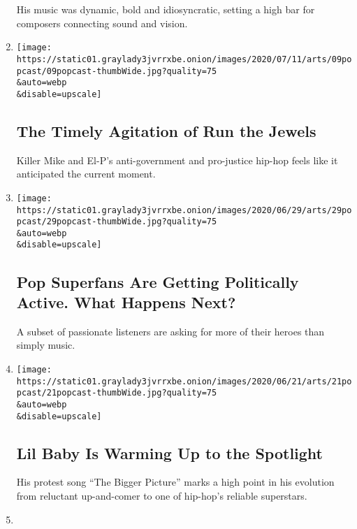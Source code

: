 \begin{enumerate}
  His music was dynamic, bold and idiosyncratic, setting a high bar for
  composers connecting sound and vision.
\item
  \href{/2020/07/09/arts/music/popcast-run-the-jewels.html}{}

  \texttt{[image: https://static01.graylady3jvrrxbe.onion/images/2020/07/11/arts/09popcast/09popcast-thumbWide.jpg?quality=75\\\&auto=webp\\\&disable=upscale]}

  \hypertarget{the-timely-agitation-of-run-the-jewels}{%
  \subsection{The Timely Agitation of Run the
  Jewels}\label{the-timely-agitation-of-run-the-jewels}}

  Killer Mike and El-P's anti-government and pro-justice hip-hop feels
  like it anticipated the current moment.
\item
  \href{/2020/06/30/arts/music/popcast-superfans-politics.html}{}

  \texttt{[image: https://static01.graylady3jvrrxbe.onion/images/2020/06/29/arts/29popcast/29popcast-thumbWide.jpg?quality=75\\\&auto=webp\\\&disable=upscale]}

  \hypertarget{pop-superfans-are-getting-politically-active-what-happens-next}{%
  \subsection{Pop Superfans Are Getting Politically Active. What Happens
  Next?}\label{pop-superfans-are-getting-politically-active-what-happens-next}}

  A subset of passionate listeners are asking for more of their heroes
  than simply music.
\item
  \href{/2020/06/21/arts/music/popcast-lil-baby.html}{}

  \texttt{[image: https://static01.graylady3jvrrxbe.onion/images/2020/06/21/arts/21popcast/21popcast-thumbWide.jpg?quality=75\\\&auto=webp\\\&disable=upscale]}

  \hypertarget{lil-baby-is-warming-up-to-the-spotlight}{%
  \subsection{Lil Baby Is Warming Up to the
  Spotlight}\label{lil-baby-is-warming-up-to-the-spotlight}}

  His protest song ``The Bigger Picture'' marks a high point in his
  evolution from reluctant up-and-comer to one of hip-hop's reliable
  superstars.
\item
  \href{/2020/06/15/arts/music/popcast-urban-music.html}{}


\end{enumerate}
